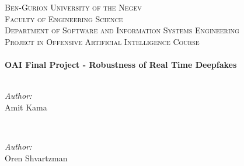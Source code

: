 \documentclass[english,12pt]{article}
\begin{document}
\begin{titlepage}
\textsc{\LARGE Ben-Gurion University of the Negev}\\[1.5cm] 

\textsc{\Large Faculty of Engineering Science}\\[0.5cm] 

\textsc{\large Department of Software and Information Systems
Engineering}\\[0.5cm] 

\textsc{\large Project in Offensive Artificial Intelligence Course}\\[0.5cm] 



\HRule \\[0.4cm]
{ \huge \bfseries OAI Final Project - Robustness of Real Time Deepfakes } \\[0.4cm] 
\HRule \\[1.5cm]
 

\begin{minipage}{0.4\textwidth}
\begin{flushleft} \large \emph{Author:}\\
Amit Kama %
\end{flushleft}
\end{minipage}
~
\begin{minipage}{0.4\textwidth}
\begin{flushright} \large \emph{Author:} \\
Oren Shvartzman %
\end{flushright}
\end{minipage}\\[1cm]

    

\end{titlepage}
\end{document}

